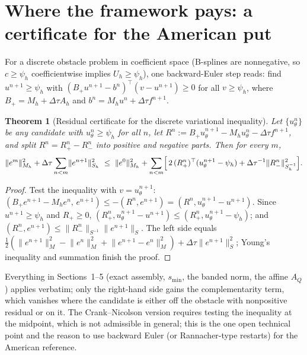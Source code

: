 \documentclass[11pt]{amsart}
\newtheorem{theorem}{Theorem}[section]
\theoremstyle{remark}
\newcommand{\norm}[1]{\lVert #1\rVert}
\begin{document}
\section{Where the framework pays: a certificate for the American put}

For a discrete obstacle problem in coefficient space (B-splines are
nonnegative, so $c\ge\psi_h$ coefficientwise implies $U_h\ge\psi_h$), one
backward-Euler step reads: find $u^{n+1}\ge\psi_h$ with
$(B_+u^{n+1}-b^n)^\top(v-u^{n+1})\ge0$ for all $v\ge\psi_h$, where
$B_+=M_h+\Delta\tau A_h$ and $b^n=M_hu^n+\Delta\tau f^{n+1}$.

\begin{theorem}[Residual certificate for the discrete variational inequality]
\label{thm:vi}
Let $\{u_\theta^n\}$ be any candidate with $u_\theta^n\ge\psi_h$ for all $n$,
let $R^n:=B_+u_\theta^{n+1}-M_hu_\theta^n-\Delta\tau f^{n+1}$, and split
$R^n=R^n_+-R^n_-$ into positive and negative parts.  Then for every $m$,
\[
 \norm{e^m}_{M_h}^2+\Delta\tau\sum_{n<m}\norm{e^{n+1}}_{S_h}^2
 \ \le\ \norm{e^0}_{M_h}^2
 +\sum_{n<m}\Bigl[\,2\,(R^n_+)^\top(u_\theta^{n+1}-\psi_h)
 +\Delta\tau^{-1}\norm{R^n_-}_{S_h^{-1}}^2\Bigr].
\]
\end{theorem}
\begin{proof}
Test the inequality with $v=u_\theta^{n+1}$:
$(B_+e^{n+1}-M_he^n,\,e^{n+1})\le-(R^n,e^{n+1})=(R^n,u_\theta^{n+1}-u^{n+1})$.
Since $u^{n+1}\ge\psi_h$ and $R_+\ge0$, $(R^n_+,u_\theta^{n+1}-u^{n+1})\le(R^n_+,u_\theta^{n+1}-\psi_h)$;
and $(R^n_-,e^{n+1})\le\norm{R^n_-}_{S^{-1}}\norm{e^{n+1}}_S$.  The left side
equals $\tfrac12(\norm{e^{n+1}}_M^2-\norm{e^n}_M^2+\norm{e^{n+1}-e^n}_M^2)+\Delta\tau\norm{e^{n+1}}_S^2$;
Young's inequality and summation finish the proof.
\end{proof}

\noindent
Everything in Sections~1--5 (exact assembly, $s_{\min}$, the banded norm,
the affine $A_Q$) applies verbatim; only the right-hand side gains the
complementarity term, which vanishes where the candidate is either off the
obstacle with nonpositive residual or on it.  The Crank--Nicolson version
requires testing the inequality at the midpoint, which is not admissible in
general; this is the one open technical point and the reason to use backward
Euler (or Rannacher-type restarts) for the American reference.
\end{document}
